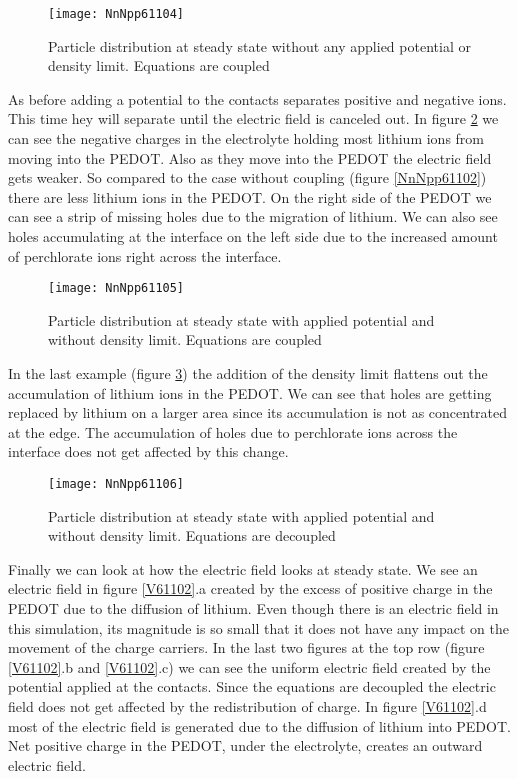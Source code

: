 \begin{figure}[!htp]
\centering
\texttt{[image: NnNpp61104]}
\caption{Particle distribution at steady state without any applied potential or density limit. Equations are coupled} 
\label{NnNpp61104}
\end{figure}

As before adding a potential to the contacts separates positive and negative ions. This time hey will separate until the electric field is canceled out. In figure \ref{NnNpp61105} we can see the negative charges in the electrolyte holding most lithium ions from moving into the PEDOT. Also as they move into the PEDOT the electric field gets weaker. So compared to the case without coupling (figure \ref{NnNpp61102}) there are less lithium ions in the PEDOT. On the right side of the PEDOT we can see a strip of missing holes due to the migration of lithium. We can also see holes accumulating at the interface on the left side due to the increased amount of perchlorate ions right across the interface.

\begin{figure}[!htp]
\centering
\texttt{[image: NnNpp61105]}
\caption{Particle distribution at steady state with applied potential and without density limit. Equations are coupled} 
\label{NnNpp61105}
\end{figure}

In the last example (figure \ref{NnNpp61106}) the addition of the density limit flattens out the accumulation of lithium ions in the PEDOT. We can see that holes are getting replaced by lithium on a larger area since its accumulation is not as concentrated at the edge. The accumulation of holes due to perchlorate ions across the interface does not get affected by this change.

\begin{figure}[!htp]
\centering
\texttt{[image: NnNpp61106]}
\caption{Particle distribution at steady state with applied potential and without density limit. Equations are decoupled} 
\label{NnNpp61106}
\end{figure}

Finally we can look at how the electric field looks at steady state. We see an electric field in figure \ref{V61102}.a created by the excess of positive charge in the PEDOT due to the diffusion of lithium. Even though there is an electric field in this simulation, its magnitude is so small that it does not have any impact on the movement of the charge carriers. In the last two figures at the top row (figure \ref{V61102}.b and \ref{V61102}.c) we can see the uniform electric field created by the potential applied at the contacts. Since the equations are decoupled the electric field does not get affected by the redistribution of charge. In figure \ref{V61102}.d most of the electric field is generated due to the diffusion of lithium into PEDOT. Net positive charge in the PEDOT, under the electrolyte, creates an outward electric field. 

